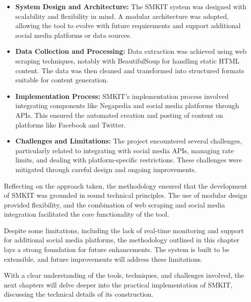 \begin{itemize}
    \item \textbf{System Design and Architecture:} The SMKIT system was designed with scalability and flexibility in mind. A modular architecture was adopted, allowing the tool to evolve with future requirements and support additional social media platforms or data sources.
    \item \textbf{Data Collection and Processing:} Data extraction was achieved using web scraping techniques, notably with BeautifulSoup for handling static HTML content. The data was then cleaned and transformed into structured formats suitable for content generation.
    \item \textbf{Implementation Process:} SMKIT’s implementation process involved integrating components like Negapedia and social media platforms through APIs. This ensured the automated creation and posting of content on platforms like Facebook and Twitter.
    \item \textbf{Challenges and Limitations:} The project encountered several challenges, particularly related to integrating with social media APIs, managing rate limits, and dealing with platform-specific restrictions. These challenges were mitigated through careful design and ongoing improvements.
\end{itemize}

Reflecting on the approach taken, the methodology ensured that the development of SMKIT was grounded in sound technical principles. The use of modular design provided flexibility, and the combination of web scraping and social media integration facilitated the core functionality of the tool.

Despite some limitations, including the lack of real-time monitoring and support for additional social media platforms, the methodology outlined in this chapter lays a strong foundation for future enhancements. The system is built to be extensible, and future improvements will address these limitations.

With a clear understanding of the tools, techniques, and challenges involved, the next chapters will delve deeper into the practical implementation of SMKIT, discussing the technical details of its construction.